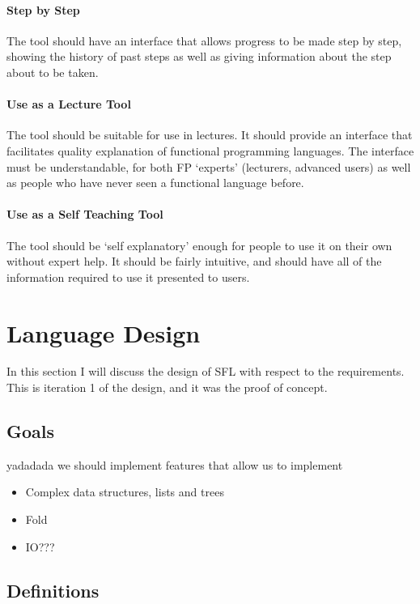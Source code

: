 \paragraph{Step by Step} The tool should have an interface that allows progress to be made step by step, showing the history of past steps as well as giving information about the step about to be taken.

\paragraph{Use as a Lecture Tool} The tool should be suitable for use in lectures. It should provide an interface that facilitates quality explanation of functional programming languages. The interface must be understandable, for both \ac{FP} `experts' (lecturers, advanced users) as well as people who have never seen a functional language before. 

\paragraph{Use as a Self Teaching Tool} The tool should be `self explanatory' enough for people to use it on their own without expert help. It should be fairly intuitive, and should have all of the information required to use it presented to users.


\section{Language Design}
In this section I will discuss the design of \ac{SFL} with respect to the requirements. This is iteration 1 of the design, and it was the proof of concept.  

\subsection{Goals}
\label{design:goals}

yadadada we should implement features that allow us to implement
\begin{itemize}
    \item Complex data structures, lists and trees
    \item Fold
    \item IO???
\end{itemize}

\subsection{Definitions}

